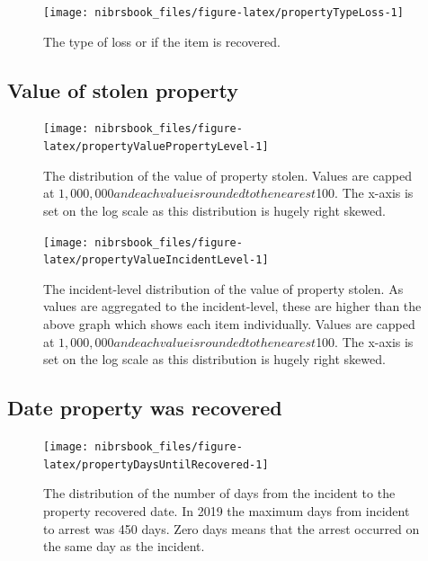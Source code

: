 \documentclass[
  12pt,
  openany]{book}
\begin{document}
\begin{figure}

{\centering \texttt{[image: nibrsbook\_files/figure-latex/propertyTypeLoss-1]} 

}

\caption{The type of loss or if the item is recovered.}\label{fig:propertyTypeLoss}
\end{figure}

\hypertarget{value-of-stolen-property}{%
\subsection{Value of stolen property}\label{value-of-stolen-property}}

\begin{figure}

{\centering \texttt{[image: nibrsbook\_files/figure-latex/propertyValuePropertyLevel-1]} 

}

\caption{The distribution of the value of property stolen. Values are capped at $1,000,000 and each value is rounded to the nearest $100. The x-axis is set on the log scale as this distribution is hugely right skewed.}\label{fig:propertyValuePropertyLevel}
\end{figure}

\begin{figure}

{\centering \texttt{[image: nibrsbook\_files/figure-latex/propertyValueIncidentLevel-1]} 

}

\caption{The incident-level distribution of the value of property stolen. As values are aggregated to the incident-level, these are higher than the above graph which shows each item individually. Values are capped at $1,000,000 and each value is rounded to the nearest $100. The x-axis is set on the log scale as this distribution is hugely right skewed.}\label{fig:propertyValueIncidentLevel}
\end{figure}

\hypertarget{date-property-was-recovered}{%
\subsection{Date property was recovered}\label{date-property-was-recovered}}

\begin{figure}

{\centering \texttt{[image: nibrsbook\_files/figure-latex/propertyDaysUntilRecovered-1]} 

}

\caption{The distribution of the number of days from the incident to the property recovered date. In 2019 the maximum days from incident to arrest was 450 days. Zero days means that the arrest occurred on the same day as the incident. }\label{fig:propertyDaysUntilRecovered}
\end{figure}
\end{document}
